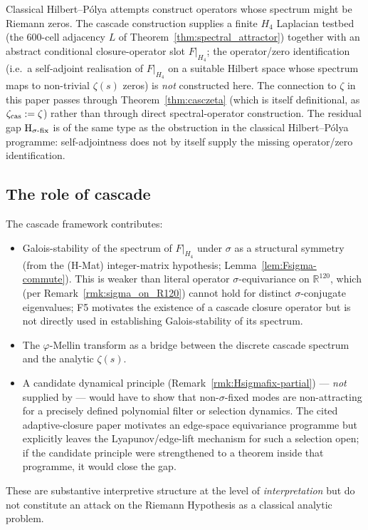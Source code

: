 \documentclass[11pt, a4paper]{amsart}
\theoremstyle{definition}
\newcommand{\R}{\mathbb{R}}
\newcommand{\pphi}{\varphi}
\begin{document}
Classical Hilbert--Pólya attempts construct operators whose
spectrum might be Riemann zeros.  The cascade construction supplies
a finite $H_4$ Laplacian testbed (the 600-cell adjacency $L$ of
Theorem~\ref{thm:spectral_attractor}) together with an abstract
conditional closure-operator slot $F|_{H_4}$; the operator/zero
identification (i.e.\ a self-adjoint realisation of $F|_{H_4}$ on a
suitable Hilbert space whose spectrum maps to non-trivial
$\zeta(s)$ zeros) is \emph{not} constructed here.  The connection
to $\zeta$ in this paper passes through
Theorem~\ref{thm:casczeta} (which is itself definitional, as
$\zeta_{\rm cas} := \zeta$) rather than through direct
spectral-operator construction. The residual gap
$\textup{H}_{\sigma\text{-fix}}$ is of the same type as the
obstruction in the classical Hilbert--Pólya programme:
self-adjointness does not by itself supply the missing
operator/zero identification.

\subsection{The role of cascade}

The cascade framework contributes:
\begin{itemize}
\item Galois-stability of the spectrum of $F|_{H_4}$ under
  $\sigma$ as a structural symmetry (from the (H-Mat)
  integer-matrix hypothesis;
  Lemma~\ref{lem:Fsigma-commute}).  This is weaker than literal
  operator $\sigma$-equivariance on $\R^{120}$, which (per
  Remark~\ref{rmk:sigma_on_R120}) cannot hold for distinct
  $\sigma$-conjugate eigenvalues; F5 motivates the existence of
  a cascade closure operator but is not directly used in
  establishing Galois-stability of its spectrum.
\item The $\pphi$-Mellin transform as a bridge between the
  discrete cascade spectrum and the analytic $\zeta(s)$.
\item A candidate dynamical principle
  (Remark~\ref{rmk:Hsigmafix-partial}) — \emph{not} supplied by
  \cite{AdaptiveClosureTransport} — would have to show that
  non-$\sigma$-fixed modes are non-attracting for a precisely
  defined polynomial filter or selection dynamics. The cited adaptive-closure paper
  motivates an edge-space equivariance programme but explicitly
  leaves the Lyapunov/edge-lift mechanism for such a selection
  open; if the candidate principle were strengthened to a theorem
  inside that programme, it would close the gap.
\end{itemize}
These are substantive interpretive structure at the level of
\emph{interpretation} but do not constitute an attack on the
Riemann Hypothesis as a classical analytic problem.
\end{document}

